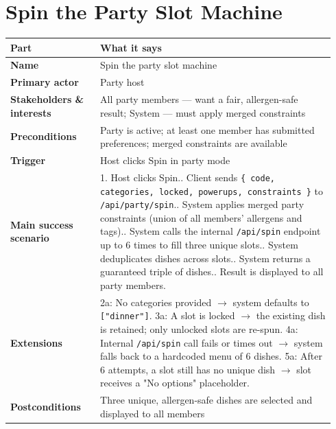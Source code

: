\documentclass[11pt,twocolumn]{article}
\newcommand{\ucheader}{%
\textbf{Part} & \textbf{What it says} \\
\hline
\endhead
\hline
\endfoot
}
\begin{document}
\section{Spin the Party Slot Machine}
{\footnotesize
\begin{longtable}{@{}p{0.26\linewidth}p{0.68\linewidth}@{}}
\hline
\ucheader
\textbf{Name} & Spin the party slot machine \\
\hline
\textbf{Primary actor} & Party host \\
\hline
\textbf{Stakeholders \& interests} & All party members --- want a fair, allergen-safe result; System --- must apply merged constraints \\
\hline
\textbf{Preconditions} & Party is active; at least one member has submitted preferences; merged constraints are available \\
\hline
\textbf{Trigger} & Host clicks Spin in party mode \\
\hline
\textbf{Main success scenario} & 1. Host clicks Spin.\newline
2. Client sends \texttt{\{ code, categories, locked, powerups, constraints \}} to \texttt{/api/party/spin}.\newline
3. System applies merged party constraints (union of all members' allergens and tags).\newline
4. System calls the internal \texttt{/api/spin} endpoint up to 6 times to fill three unique slots.\newline
5. System deduplicates dishes across slots.\newline
6. System returns a guaranteed triple of dishes.\newline
7. Result is displayed to all party members. \\
\hline
\textbf{Extensions} & 2a: No categories provided $\rightarrow$ system defaults to \texttt{["dinner"]}.\newline
3a: A slot is locked $\rightarrow$ the existing dish is retained; only unlocked slots are re-spun.\newline
4a: Internal \texttt{/api/spin} call fails or times out $\rightarrow$ system falls back to a hardcoded menu of 6 dishes.\newline
5a: After 6 attempts, a slot still has no unique dish $\rightarrow$ slot receives a "No options" placeholder. \\
\hline
\textbf{Postconditions} & Three unique, allergen-safe dishes are selected and displayed to all members \\
\hline
\end{longtable}
}
\end{document}
